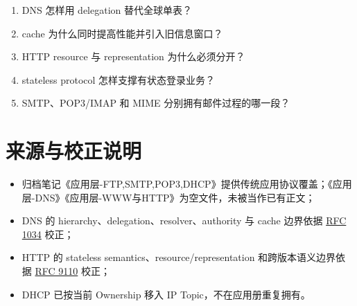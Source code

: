 \documentclass[UTF8,fontset=none,11pt,a4paper]{ctexart}
\providecommand{\tightlist}{\setlength{\itemsep}{0pt}\setlength{\parskip}{0pt}}
\begin{document}
\begin{enumerate}
\def\labelenumi{\arabic{enumi}.}
\tightlist
\item
  DNS 怎样用 delegation 替代全球单表？
\item
  cache 为什么同时提高性能并引入旧信息窗口？
\item
  HTTP resource 与 representation 为什么必须分开？
\item
  stateless protocol 怎样支撑有状态登录业务？
\item
  SMTP、POP3/IMAP 和 MIME 分别拥有邮件过程的哪一段？
\end{enumerate}

\section{来源与校正说明}\label{14-ux6765ux6e90ux4e0eux6821ux6b63ux8bf4ux660e}

\begin{itemize}
\tightlist
\item
  归档笔记《应用层-FTP,SMTP,POP3,DHCP》提供传统应用协议覆盖；《应用层-DNS》《应用层-WWW与HTTP》为空文件，未被当作已有正文；
\item
  DNS 的 hierarchy、delegation、resolver、authority 与 cache 边界依据
  \href{https://www.rfc-editor.org/rfc/rfc1034.html}{RFC 1034} 校正；
\item
  HTTP 的 stateless semantics、resource/representation
  和跨版本语义边界依据
  \href{https://www.rfc-editor.org/rfc/rfc9110.html}{RFC 9110} 校正；
\item
  DHCP 已按当前 Ownership 移入 IP Topic，不在应用册重复拥有。
\end{itemize}
\end{document}
